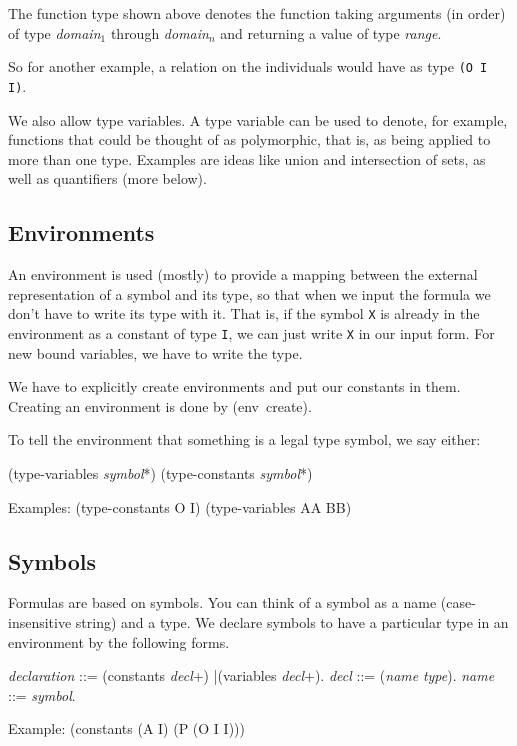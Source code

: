 The function type shown above denotes the function taking arguments (in order)
of type {\it domain$_1$} through {\it domain$_n$} and returning a value of
type {\it range}. 

So for another example, a relation on the individuals would have 
as type {\tt (O I I)}.

We also allow type variables.  A type variable can be used to denote, for
example, functions that could be thought of as polymorphic, that is, as 
being applied to more than one type.  Examples are ideas like union and
intersection of sets, as well as quantifiers (more below).

\subsection{Environments}

An environment is used (mostly) to provide a mapping between the external
representation of a symbol and its type, so that when we input the formula
we don't have to write its type with it.  That is, if the symbol {\tt X} is
already in the environment as a constant of type {\tt I}, we can just
write {\tt X} in our input form.  For new bound variables, we have to
write the type. 

We have to explicitly create environments and put our constants in them.
Creating an environment is done by {\vb (env~create)}.  

To tell the environment that something is a legal type symbol, we say either:

\begin{code}
(type-variables {\it symbol}*)
(type-constants {\it symbol}*)

Examples:
 (type-constants O I)
 (type-variables AA BB)
\end{code}

\subsection{Symbols}

Formulas are based on symbols.  You can think of a symbol as a name
(case-insensitive string) and a type.  We declare symbols to have a
particular type in an environment by the following forms.

\begin{code}
{\it declaration} ::= (constants {\it decl}+) |(variables {\it decl}+).
{\it decl} ::= ({\it name} {\it type}).
{\it name} ::= {\it symbol}.

Example: (constants (A I) (P (O I I)))
\end{code}

